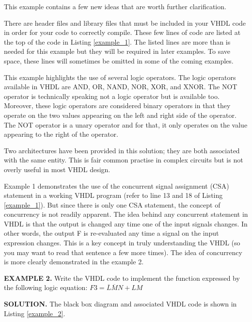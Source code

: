 This example contains a few new ideas that are worth further clarification.
\begin{my_list}
\item There are header files and library files that must be included in your VHDL code in order for your code to correctly compile. These few lines of code are listed at the top of the code in Listing \ref{example_1}. The listed lines are more than is needed for this example but they will be required in later examples. To save space, these lines will sometimes be omitted in some of the coming examples.
\item This example highlights the use of several logic operators. The logic operators available in VHDL are AND, OR, NAND, NOR, XOR, and XNOR. The NOT operator is technically speaking not a logic operator but is available too. Moreover, these logic operators are considered binary operators in that they operate on the two values appearing on the left and right side of the operator. The NOT operator is a unary operator and for that, it only operates on the value appearing to the right of the operator.
\item Two architectures have been provided in this solution; they are both associated with the same entity. This is fair common practise in complex circuits but is not overly useful in most VHDL design.
\end{my_list}
Example 1 demonstrates the use of the concurrent signal assignment (CSA) statement in a working VHDL program (refer to line 13 and 18 of Listing \ref{example_1}). But since there is only one CSA statement, the concept of concurrency is not readily apparent. The idea behind any concurrent statement in VHDL is that the output is changed any time one of the input signals changes. In other words, the output F is re-evaluated any time a signal on the input expression changes. This is a key concept in truly understanding the VHDL (so you may want to read that sentence a few more times). The idea of concurrency is more clearly demonstrated in the example 2.

\begin{leftbar}
\noindent
\textbf{EXAMPLE 2.}
Write the VHDL code to implement the function expressed by the following logic equation: $F3=\overline{L}\overline{M}N+LM$
\end{leftbar}
\noindent
\textbf{SOLUTION.} The black box diagram and associated VHDL code is shown in Listing \ref{example_2}.

